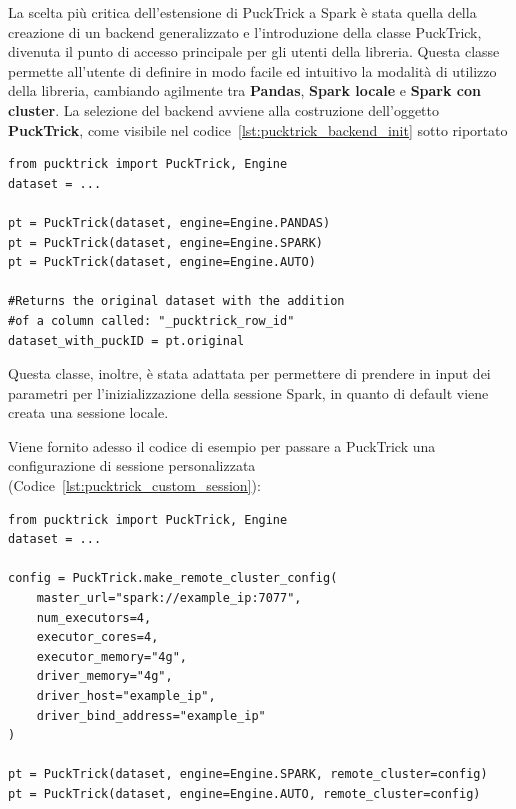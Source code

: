 \documentclass[../main.tex]{subfiles}
\begin{document}
La scelta più critica dell'estensione di PuckTrick a Spark è stata quella della creazione di un backend generalizzato e l'introduzione della classe PuckTrick, divenuta il punto di accesso principale per gli utenti della libreria. Questa classe permette all'utente di definire in modo facile ed intuitivo la modalità di utilizzo della libreria, cambiando agilmente tra \textbf{Pandas}, \textbf{Spark locale} e \textbf{Spark con cluster}.
La selezione del backend avviene alla costruzione  dell'oggetto \textbf{PuckTrick}, come visibile nel codice~\ref{lst:pucktrick_backend_init} sotto riportato

\begin{listing}[H]
\begin{verbatim}
from pucktrick import PuckTrick, Engine
dataset = ...

pt = PuckTrick(dataset, engine=Engine.PANDAS)
pt = PuckTrick(dataset, engine=Engine.SPARK)
pt = PuckTrick(dataset, engine=Engine.AUTO)

#Returns the original dataset with the addition 
#of a column called: "_pucktrick_row_id"
dataset_with_puckID = pt.original
\end{verbatim}
\caption{Selezione esplicita del backend alla creazione dell'oggetto PuckTrick.}
\label{lst:pucktrick_backend_init}
\end{listing}

Questa classe, inoltre, è stata adattata per permettere di prendere in input dei parametri per l'inizializzazione della sessione Spark, in quanto di default viene creata una sessione locale.

Viene fornito adesso il codice di esempio per passare a PuckTrick una configurazione di sessione personalizzata (Codice~\ref{lst:pucktrick_custom_session}):

\begin{listing}[H]
\begin{verbatim}
from pucktrick import PuckTrick, Engine
dataset = ...

config = PuckTrick.make_remote_cluster_config(
    master_url="spark://example_ip:7077",
    num_executors=4,
    executor_cores=4,
    executor_memory="4g",
    driver_memory="4g",
    driver_host="example_ip",
    driver_bind_address="example_ip"
)

pt = PuckTrick(dataset, engine=Engine.SPARK, remote_cluster=config)
pt = PuckTrick(dataset, engine=Engine.AUTO, remote_cluster=config)
\end{verbatim}
\caption{Creazione di una istanza di PuckTrick con configurazione Spark personalizzata}
\label{lst:pucktrick_custom_session}
\end{listing}
\end{document}
